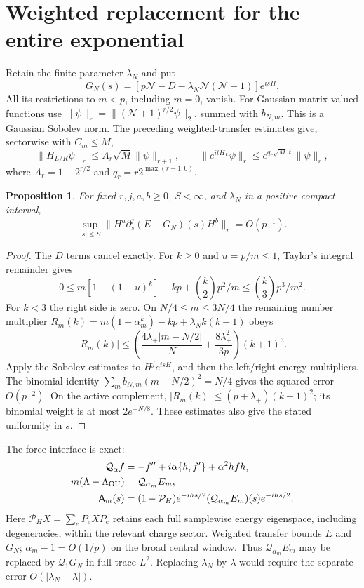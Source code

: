 \documentclass[11pt]{article}
\newcommand{\NN}{\mathcal N}
\newcommand{\PP}{\mathcal P_H}
\newcommand{\QQ}{\mathcal Q}
\newtheorem{proposition}{Proposition}
\begin{document}
\newpage
\section{Weighted replacement for the entire exponential}
Retain the finite parameter $\lambda_N$ and put
\begin{equation}
 G_N(s)=[p\NN-D-\lambda_N\NN(\NN-1)]e^{isH}.\label{eq:G}
\end{equation}
All its restrictions to $m<p$, including $m=0$, vanish.
For Gaussian matrix-valued functions use
$\|\psi\|_r=\|(\NN+1)^{r/2}\psi\|_2$, summed with $b_{N,m}$.
This is a Gaussian Sobolev norm. The preceding weighted-transfer
estimates \cite{Uniform} give, sectorwise with $C_m\le M$,
\begin{equation}
 \|H_{L/R}\psi\|_r\le A_r\sqrt M\|\psi\|_{r+1},\qquad
 \|e^{itH_L}\psi\|_r\le e^{q_r\sqrt M|t|}\|\psi\|_r,
\end{equation}
where $A_r=1+2^{r/2}$ and $q_r=r2^{\max(r-1,0)}$.

\begin{proposition}
For fixed $r,j,a,b\ge0$, $S<\infty$, and $\lambda_N$ in a positive
compact interval,
\begin{equation}
 \sup_{|s|\le S}\|H^a\partial_s^j(E-G_N)(s)H^b\|_r=O(p^{-1}).
 \label{eq:weighted}
\end{equation}
\end{proposition}
\begin{proof}
The $D$ terms cancel exactly. For $k\ge0$ and $u=p/m\le1$,
Taylor's integral remainder gives
\begin{equation}
0\le m[1-(1-u)^k]-kp+\binom k2p^2/m
 \le\binom k3p^3/m^2.\label{eq:Taylor}
\end{equation}
For $k<3$ the right side is zero. On $N/4\le m\le3N/4$ the
remaining number multiplier $R_m(k)=m(1-\alpha_m^k)-kp+
\lambda_Nk(k-1)$ obeys
\begin{equation}
 |R_m(k)|\le
 \left(\frac{4\lambda_+|m-N/2|}{N}
       +\frac{8\lambda_+^2}{3p}\right)(k+1)^3.\label{eq:R}
\end{equation}
Apply the Sobolev estimates to $H^je^{isH}$, and then the left/right
energy multipliers. The binomial identity
$\sum_m b_{N,m}(m-N/2)^2=N/4$ gives the squared error $O(p^{-2})$.
On the active complement, $|R_m(k)|\le(p+\lambda_+)(k+1)^2$;
its binomial weight is at most $2e^{-N/8}$. These estimates also
give the stated uniformity in $s$.
\end{proof}

The force interface is exact:
\begin{align}
 \QQ_\alpha f&=-f''+i\alpha\{h,f'\}+\alpha^2hfh,\\
 m(\Lambda-\Lambda_{\rm OU})&=\QQ_{\alpha_m}E_m,\\
 \mathsf A_m(s)&=(1-\PP)e^{-ihs/2}(\QQ_{\alpha_m}E_m)(s)e^{-ihs/2}.
\end{align}
Here $\PP X=\sum_e P_eXP_e$ retains each full samplewise energy
eigenspace, including degeneracies, within the relevant charge sector.
Weighted transfer bounds $E$ and $G_N$; $\alpha_m-1=O(1/p)$ on
the broad central window. Thus $\QQ_{\alpha_m}E_m$ may be replaced
by $\QQ_1G_N$ in full-trace $L^2$. Replacing $\lambda_N$ by $\lambda$
would require the separate error $O(|\lambda_N-\lambda|)$.
\end{document}
